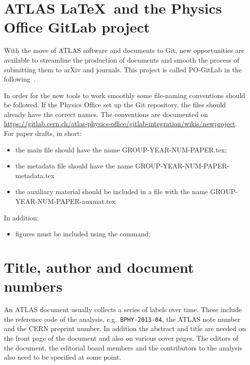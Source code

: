 \section{ATLAS \LaTeX\ and the Physics Office GitLab project}

With the move of ATLAS software and documents to Git,
new opportunities are available to streamline the production of documents
and smooth the process of submitting them to arXiv and journals.
This project is called PO-GitLab in the following~\cite{atlas-PO-gitlab}.

In order for the new tools to work smoothly some file-naming conventions should be followed.
If the Physics Office set up the Git repository, the files should already have the correct names.
The conventions are documented on
\url{https://gitlab.cern.ch/atlas-physics-office/gitlab-integration/wikis/newproject}.
For paper drafts, in short:
\begin{itemize}
  \item the main file should have the name GROUP-YEAR-NUM-PAPER.tex;
  \item the metadata file should have the name GROUP-YEAR-NUM-PAPER-metadata.tex
  \item the auxiliary material should be included in a file with the name GROUP-YEAR-NUM-PAPER-auxmat.tex
\end{itemize}

In addition:
\begin{itemize}
  \item figures must be included using the  command;
\end{itemize}

\section{Title, author and document numbers}
\label{sec:metadata}

An ATLAS document usually collects a series of labels over time.
These include the reference code of the analysis, e.g.\ \texttt{BPHY-2013-04}, 
the ATLAS note number and the CERN preprint number.
In addition the abstract and title are needed on the front page of the document and also on various cover pages.
The editors of the document, the editorial board members and the contributors to the analysis
also need to be specified at some point.

